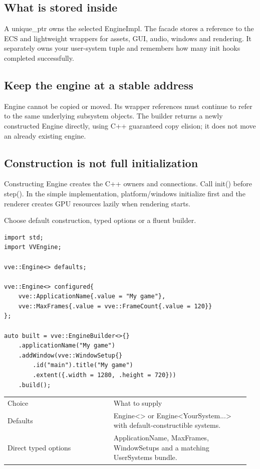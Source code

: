 \documentclass[11pt,a4paper]{article}
\begin{document}
\subsection*{What is stored inside}
A unique\_ptr owns the selected EngineImpl. The facade stores a reference to the ECS and lightweight wrappers for assets, GUI, audio, windows and rendering. It separately owns your user-system tuple and remembers how many init hooks completed successfully.

\subsection*{Keep the engine at a stable address}
Engine cannot be copied or moved. Its wrapper references must continue to refer to the same underlying subsystem objects. The builder returns a newly constructed Engine directly, using C++ guaranteed copy elision; it does not move an already existing engine.

\subsection*{Construction is not full initialization}
Constructing Engine creates the C++ owners and connections. Call init() before step(). In the simple implementation, platform/windows initialize first and the renderer creates GPU resources lazily when rendering starts.

\label{core-7}
Choose default construction, typed options or a fluent builder.

\begin{lstlisting}[language={}]
import std;
import VVEngine;

vve::Engine<> defaults;

vve::Engine<> configured{
    vve::ApplicationName{.value = "My game"},
    vve::MaxFrames{.value = vve::FrameCount{.value = 120}}
};

auto built = vve::EngineBuilder<>{}
    .applicationName("My game")
    .addWindow(vve::WindowSetup{}
        .id("main").title("My game")
        .extent({.width = 1280, .height = 720}))
    .build();
\end{lstlisting}

{\small
\begin{longtable}{@{}p{0.42\linewidth}p{0.54\linewidth}@{}}
Choice & What to supply \\
Defaults & Engine<> or Engine<YourSystem...> with default-constructible systems. \\
Direct typed options & ApplicationName, MaxFrames, WindowSetups and a matching UserSystems bundle. \\
\end{longtable}
}
\end{document}
